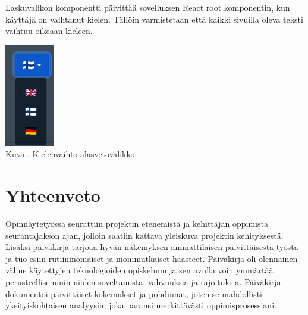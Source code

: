 \documentclass[11pt,a4paper,titlepage,oneside]{article}
\begin{document}
Laskuvalikon komponentti päivittää sovelluksen React root komponentin, kun käyttäjä on vaihtanut kielen.
Tällöin varmistetaan että kaikki sivuilla oleva teksti vaihtuu oikeaan kieleen.
\medskip


\bigskip
\includegraphics[]{src/public/locale_laskuvalikko.png}\\
Kuva \getImgCount {}. Kielenvaihto alasvetovalikko













\newpage
{} %










\newpage
\section{Yhteenveto}             %





Opinnäytetyössä seurattiin projektin etenemistä ja kehittäjän oppimista seurantajakson ajan,
jolloin saatiin kattava yleiskuva projektin kehityksestä.
Lisäksi päiväkirja tarjoaa hyvän näkemyksen ammattilaisen päivittäisestä työstä ja tuo esiin rutiininomaiset ja monimutkaiset haasteet. 
Päiväkirja oli olennainen väline käytettyjen teknologioiden opiskeluun
ja sen avulla voin ymmärtää perusteellisemmin niiden soveltamista, vahvuuksia ja rajoituksia. 
Päiväkirja dokumentoi päivittäiset kokemukset ja pohdinnat,
joten se mahdollisti yksityiskohtaisen analyysin, joka paransi merkittävästi oppimisprosessiani.
\medskip
\end{document}
